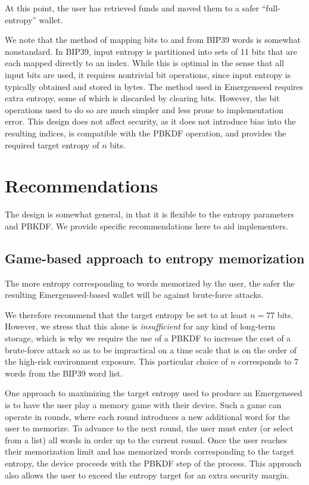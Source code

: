 \documentclass{article}
\begin{document}
At this point, the user has retrieved funds and moved them to a safer ``full-entropy'' wallet.

We note that the method of mapping bits to and from BIP39 words is somewhat nonstandard.
In BIP39, input entropy is partitioned into sets of 11 bits that are each mapped directly to an index.
While this is optimal in the sense that all input bits are used, it requires nontrivial bit operations, since input entropy is typically obtained and stored in bytes.
The method used in Emergenseed requires extra entropy, some of which is discarded by clearing bits.
However, the bit operations used to do so are much simpler and less prone to implementation error.
This design does not affect security, as it does not introduce bias into the resulting indices, is compatible with the PBKDF operation, and provides the required target entropy of $n$ bits.


\section{Recommendations}

The design is somewhat general, in that it is flexible to the entropy parameters and PBKDF.
We provide specific recommendations here to aid implementers.


\subsection{Game-based approach to entropy memorization}

The more entropy corresponding to words memorized by the user, the safer the resulting Emergenseed-based wallet will be against brute-force attacks.

We therefore recommend that the target entropy be set to at least $n = 77$ bits.
However, we stress that this alone is \textit{insufficient} for any kind of long-term storage, which is why we require the use of a PBKDF to increase the cost of a brute-force attack so as to be impractical on a time scale that is on the order of the high-risk environment exposure.
This particular choice of $n$ corresponds to $7$ words from the BIP39 word list.

One approach to maximizing the target entropy used to produce an Emergenseed is to have the user play a memory game with their device.
Such a game can operate in rounds, where each round introduces a new additional word for the user to memorize.
To advance to the next round, the user must enter (or select from a list) all words in order up to the current round.
Once the user reaches their memorization limit and has memorized words corresponding to the target entropy, the device proceeds with the PBKDF step of the process.
This approach also allows the user to exceed the entropy target for an extra security margin.
\end{document}
